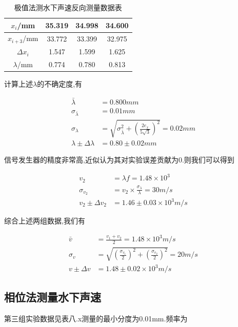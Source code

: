 \documentclass[a4paper,10pt,notitlepage]{article}
\begin{document}
\begin{table}[htbp]
\centering

	\begin{tabular}{|c|c|c|c|}
	\hline
	$x_{i}$/mm & 35.319 & 34.998 & 34.600 \\
	\hline
	$x_{i+3}$/mm & 33.772 & 33.399 & 32.975 \\
	\hline
	$\Delta x_i$ & 1.547 & 1.599 & 1.625 \\
	\hline
	$\lambda$/mm & 0.774 & 0.780 & 0.813 \\
	\hline
	\end{tabular}
	\caption{极值法测水下声速反向测量数据表}

\end{table}

	计算上述$\lambda$的不确定度,有 
	
\begin{align}
	\bar{\lambda} &= 0.800mm \\
	\sigma_{\bar{\lambda}} &= 0.01 mm \\
	\sigma_\lambda &= \sqrt{\sigma_{\bar{\lambda}} ^ 2 + (\frac{2e_x}{5\sqrt{3}})^2}  = 0.02mm \\
	\lambda \pm \Delta \lambda &= 0.80 \pm 0.02 mm
\end{align}

	信号发生器的精度非常高,近似认为其对实验误差贡献为0.则我们可以得到 
	
\begin{align}
	v_2 &= \lambda f = 1.48 \times 10^3 \\
	\sigma_{v_2} &= v_2 \times \frac{\sigma_{\lambda}}{\lambda} = 30 m/s \\
	v_2 \pm \Delta v_2 &= 1.46 \pm 0.03 \times 10^3 m/s
\end{align}

	综合上述两组数据,我们有
	
\begin{align}
	\bar{v} &= \frac{v_1 + v_2}{2} = 1.48 \times 10^3 m/s \\
	\sigma_v &= \sqrt{(\frac{\sigma_{v_1}}{2})^2 + (\frac{\sigma_{v_2}}{2})^2} = 20 m/s \\
	v \pm \Delta v &= 1.48 \pm 0.02 \times 10^3 m/s
\end{align}

\subsection{相位法测量水下声速}

	第三组实验数据见表八.x测量的最小分度为0.01mm.频率为
	
\end{document}
